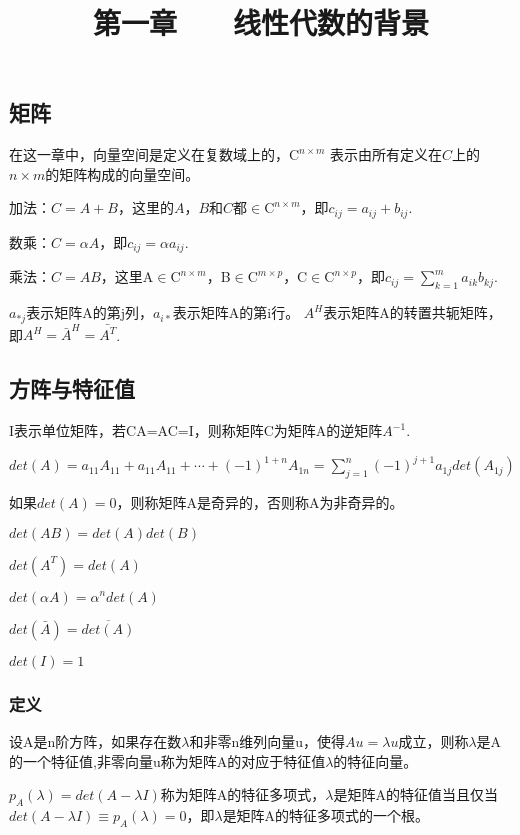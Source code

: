 \documentclass{article}
\begin{document}
\title{第一章$\qquad$线性代数的背景}
\maketitle  %
\section{}
\subsection{矩阵}
在这一章中，向量空间是定义在复数域上的，$\mathrm{C}^{n\times m}$ 表示由所有定义在$C$上的$n\times m$的矩阵构成的向量空间。

加法：$C=A+B$，这里的$A$，$B$和$C$都$\in\mathrm{C}^{n\times m}$，即$c_{ij}=a_{ij}+b_{ij}$.

数乘：$C=\alpha A$，即$c_{ij}=\alpha a_{ij}$.

乘法：$C=AB$，这里A$\in\mathrm{C}^{n\times m}$，B$\in\mathrm{C}^{m\times p}$，C$\in\mathrm{C}^{n\times p}$，即$c_{ij}=\sum_{k=1}^m a_{ik}b_{kj}$.

$a_{*j}$表示矩阵A的第j列，$a_{i*}$表示矩阵A的第i行。
$A^H$表示矩阵A的转置共轭矩阵，即$A^H=\bar{A}^H=\bar{A^T}$.
\subsection{方阵与特征值}
I表示单位矩阵，若CA=AC=I，则称矩阵C为矩阵A的逆矩阵$A^{-1}$.

$det(A)=a_{11}A_{11}+a_{11}A_{11}+\cdots+(-1)^{1+n}A_{1n}=\sum_{j=1}^n (-1)^{j+1} a_{1j}det(A_{1j}) $  

如果$det(A)=0$，则称矩阵A是奇异的，否则称A为非奇异的。

$det(AB)=det(A)det(B)$

$det(A^T)=det(A)$

$det(\alpha A)=\alpha ^n det(A)$

$det(\bar{A})=\overline{det(A)}$

$det(I)=1$

\subsubsection{定义}
设A是n阶方阵，如果存在数$\lambda$和非零n维列向量u，使得$Au=\lambda u$成立，则称$\lambda$是A的一个特征值,非零向量u称为矩阵A的对应于特征值$\lambda$的特征向量。

$p_A(\lambda)=det(A-\lambda I)$称为矩阵A的特征多项式，$\lambda $是矩阵A的特征值当且仅当$det(A-\lambda I)\equiv p_A(\lambda)=0$，即$\lambda $是矩阵A的特征多项式的一个根。
\end{document}
